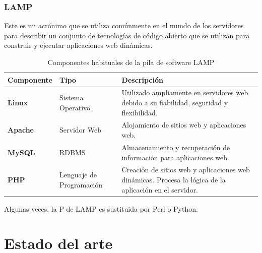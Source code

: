             \newpage


        \subsection{LAMP}

            Este es un acrónimo que se utiliza comúnmente en el mundo de los servidores para describir un conjunto de tecnologías de código abierto que se utilizan para construir y ejecutar aplicaciones web dinámicas.

            \begin{table}[!htbp]
                  \centering
                  
                  \begin{tabular}{|>{\centering\arraybackslash}m{3cm}|>{\centering\arraybackslash}m{3cm}|>{\centering\arraybackslash}m{8cm}|}
                        \hline
                        \textbf{Componente} & \textbf{Tipo} & \textbf{Descripción} \\
                        \hline
                        \hline
                        \textbf{Linux} & Sistema Operativo & Utilizado ampliamente en servidores web debido a su fiabilidad, seguridad y flexibilidad. \\
                        \hline
                        \textbf{Apache} & Servidor Web & Alojamiento de sitios web y aplicaciones web. \\
                        \hline
                        \textbf{MySQL} & RDBMS & Almacenamiento y recuperación de información para aplicaciones web. \\
                        \hline
                        \textbf{PHP} & Lenguaje de Programación & Creación de sitios web y aplicaciones web dinámicas. Procesa la lógica de la aplicación en el servidor. \\
                        \hline
                  \end{tabular}

                  \caption{Componentes habituales de la pila de software LAMP}
                  \label{table:lamp}
            \end{table}
            
            Algunas veces, la P de LAMP es sustituida por Perl o Python.                  

            \cleardoublepage

    
     
\chapter{Estado del arte}
    \label{cap:estado-arte}

